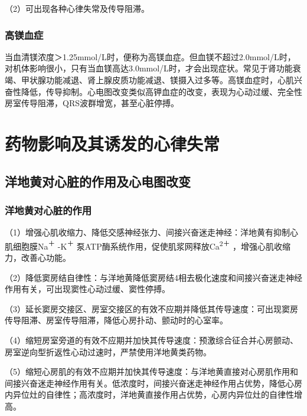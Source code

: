 （2）可出现各种心律失常及传导阻滞。

\protect\hypertarget{text00053.htmlux5cux23subid644}{}{}

\subsection{高镁血症}

当血清镁浓度＞1.25mmol/L时，便称为高镁血症。但血镁不超过2.0mmol/L时，对机体影响很小，只有当血镁高达3.0mmol/L时，才会出现症状。常见于肾功能衰竭、甲状腺功能减退、肾上腺皮质功能减退、镁摄入过多等。高镁血症时，心肌兴奋性降低，传导抑制。心电图改变类似高钾血症的改变，表现为心动过缓、完全性房室传导阻滞，QRS波群增宽，甚至心脏停搏。

\protect\hypertarget{text00054.html}{}{}

\protect\hypertarget{text00054.htmlux5cux23chapter54}{}{}

\chapter{药物影响及其诱发的心律失常}

\protect\hypertarget{text00054.htmlux5cux23subid645}{}{}

\section{洋地黄对心脏的作用及心电图改变}

\protect\hypertarget{text00054.htmlux5cux23subid646}{}{}

\subsection{洋地黄对心脏的作用}

（1）增强心肌收缩力、降低交感神经张力、间接兴奋迷走神经：洋地黄有抑制心肌细胞膜Na\textsuperscript{＋}
-K\textsuperscript{＋}
泵ATP酶系统作用，促使肌浆网释放Ca\textsuperscript{2＋}
，增强心肌收缩力，改善心功能。

（2）降低窦房结自律性：与洋地黄降低窦房结4相去极化速度和间接兴奋迷走神经作用有关，可出现窦性心动过缓、窦性停搏。

（3）延长窦房交接区、房室交接区的有效不应期并降低其传导速度：可出现窦房传导阻滞、房室传导阻滞，降低心房扑动、颤动时的心室率。

（4）缩短房室旁道的有效不应期并加快其传导速度：预激综合征合并心房颤动、房室逆向型折返性心动过速时，严禁使用洋地黄类药物。

（5）缩短心房肌的有效不应期并加快其传导速度：与洋地黄直接对心房肌作用和间接兴奋迷走神经作用有关。低浓度时，间接兴奋迷走神经作用占优势，降低心房内异位灶的自律性；高浓度时，洋地黄直接作用占优势，心房内异位灶的自律性增高。

